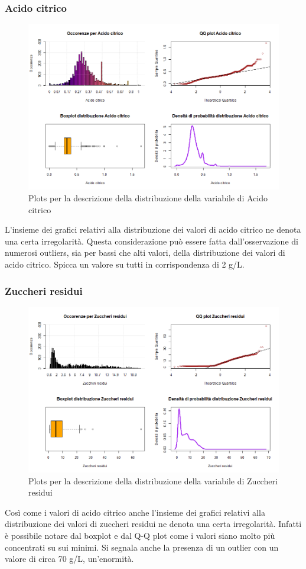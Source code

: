 \documentclass[12pt]{article}
\begin{document}
\subsubsection{Acido citrico}
\begin{figure}[!htb]
    \centering
    \includegraphics[width=1\textwidth]{immagini/accit.png}
    \caption{Plots per la descrizione della distribuzione della variabile di Acido citrico}
\end{figure}
\FloatBarrier
L'insieme dei grafici relativi alla distribuzione dei valori di acido citrico ne denota una certa irregolarità. Questa considerazione può essere fatta dall'osservazione di numerosi outliers, sia per bassi che alti valori, della distribuzione dei valori di acido citrico. Spicca un valore su tutti in corrispondenza di 2 g/L.
\newpage
\subsubsection{Zuccheri residui}
\begin{figure}[!htb]
    \centering
    \includegraphics[width=1\textwidth]{immagini/zr.png}
    \caption{Plots per la descrizione della distribuzione della variabile di Zuccheri residui}
\end{figure}
\FloatBarrier
Così come i valori di acido citrico anche l'insieme dei grafici relativi alla distribuzione dei valori di zuccheri residui ne denota una certa irregolarità. Infatti è possibile notare dal boxplot e dal Q-Q plot come i valori siano molto più concentrati su sui minimi. Si segnala anche la presenza di un outlier con un valore di circa 70 g/L, un'enormità.
\newpage
\end{document}

